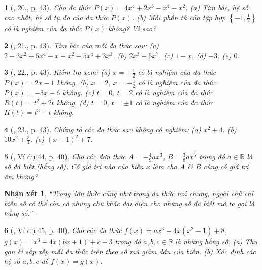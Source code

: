 \documentclass{article}
\newtheorem{baitoan}{}
\newtheorem{nhanxet}{Nhận xét}
\begin{document}
\begin{baitoan}[\cite{SBT_Toan_7_Canh_Dieu_tap_2}, 20., p. 43]
	Cho đa thức $P(x) = 4x^4 + 2x^3 - x^4 - x^2$. (a) Tìm bậc, hệ số cao nhất, hệ số tự do của đa thức $P(x)$. (b) Mỗi phần tử của tập hợp $\left\{-1,\frac{1}{2}\right\}$ có là nghiệm của đa thức $P(x)$ không? Vì sao?
\end{baitoan}

\begin{baitoan}[\cite{SBT_Toan_7_Canh_Dieu_tap_2}, 21., p. 43]
	Tìm bậc của mỗi đa thức sau: (a) $2 - 3x^2 + 5x^4 - x - x^2 - 5x^4 + 3x^3$. (b) $2x^3 - 6x^7$. (c) $1 - x$. (d) $-3$. (e) $0$.
\end{baitoan}

\begin{baitoan}[\cite{SBT_Toan_7_Canh_Dieu_tap_2}, 22., p. 43]
	Kiểm tra xem: (a) $x = \pm\frac{1}{2}$ có là nghiệm của đa thức $P(x) = 2x - 1$ không. (b) $x = 2$, $x = -\frac{1}{2}$ có là nghiệm của đa thức $P(x) = -3x + 6$ không. (c) $t = 0$, $t = 2$ có là nghiệm của đa thức $R(t) = t^2 + 2t$ không. (d) $t = 0$, $t = \pm1$ có là nghiệm của đa thức $H(t) = t^3 - t$ không.
\end{baitoan}

\begin{baitoan}[\cite{SBT_Toan_7_Canh_Dieu_tap_2}, 23., p. 43]
	Chứng tỏ các đa thức sau không có nghiệm: (a) $x^2 + 4$. (b) $10x^2 + \frac{3}{4}$. (c) $(x - 1)^2 + 7$.
\end{baitoan}

\begin{baitoan}[\cite{Tuyen_Toan_7}, Ví dụ 44, p. 40]
	Cho các đơn thức $A = -\frac{4}{9}ax^3$, $B = \frac{3}{8}ax^5$ trong đó $a\in\mathbb{R}$ là số đã biết (hằng số). Có giá trị nào của biến $x$ làm cho $A$ \& $B$ cùng có giá trị âm không?
\end{baitoan}

\begin{nhanxet}
	``Trong đơn thức cũng như trong đa thức nói chung, ngoài chữ chỉ biến số có thể còn có những chữ khác đại diện cho những số đã biết mà ta gọi là \emph{hằng số}.'' -- \cite[p. 40]{Tuyen_Toan_7}
\end{nhanxet}

\begin{baitoan}[\cite{Tuyen_Toan_7}, Ví dụ 45, p. 40]
	Cho các đa thức $f(x) = ax^3 + 4x(x^2 - 1) + 8$, $g(x) = x^3 - 4x(bx + 1) + c - 3$ trong đó $a,b,c\in\mathbb{R}$ là những hằng số. (a) Thu gọn \& sắp xếp mỗi đa  thức trên theo số mũ giảm dần của biến. (b) Xác định các hệ số $a,b,c$ để $f(x) = g(x)$.
\end{baitoan}
\end{document}
